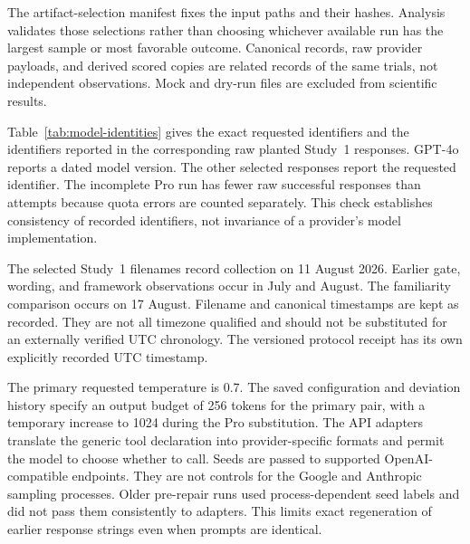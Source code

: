 \documentclass[final,5p,times,twocolumn]{elsarticle}
\begin{document}
The artifact-selection manifest fixes the input paths and their
hashes. Analysis validates those selections rather than choosing whichever
available run has the largest sample or most favorable outcome. Canonical
records, raw provider payloads, and derived scored copies are related records
of the same trials, not independent observations. Mock and dry-run files are
excluded from scientific results.


Table~\ref{tab:model-identities} gives the exact requested identifiers and the
identifiers reported in the corresponding raw planted Study~1 responses. GPT-4o
reports a dated model version. The other selected responses report the requested
identifier. The incomplete Pro run has fewer raw successful responses than
attempts because quota errors are counted separately. This check establishes
consistency of recorded identifiers, not invariance of a provider's model
implementation.

The selected Study~1 filenames record collection on 11 August 2026. Earlier gate,
wording, and framework observations occur in July and August. The familiarity
comparison occurs on 17 August. Filename and canonical timestamps are kept
as recorded. They are not all timezone qualified and should not be substituted
for an externally verified UTC chronology. The versioned protocol receipt has
its own explicitly recorded UTC timestamp.

The primary requested temperature is 0.7. The saved configuration and
deviation history specify an output budget of 256 tokens for the primary
pair, with a temporary increase to 1024 during the Pro substitution. The
API adapters translate the generic tool declaration into provider-specific
formats and permit the model to choose whether to call. Seeds are passed to
supported OpenAI-compatible endpoints. They are not controls for the Google
and Anthropic sampling processes. Older pre-repair runs used process-dependent
seed labels and did not pass them consistently to adapters. This limits exact
regeneration of earlier response strings even when prompts are identical.
\end{document}
